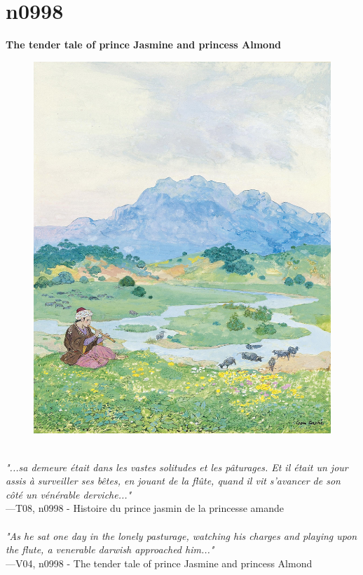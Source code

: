 \documentclass[../Carre_nights.tex]{subfiles}
\begin{document}
\newpage

\section{n0998}
\textbf{\Large{The tender tale of prince Jasmine and princess Almond}} \\

\begin{figure}[ht]
\centering
\includegraphics[height=\figsize]{illustrations/volume_8/T08, n0998 - Histoire du prince jasmin de la princesse amande.jpg}
\end{figure}

\textit{\\
"...sa demeure était dans les vastes solitudes et les pâturages. Et il était un jour assis à surveiller ses bêtes, en jouant de la flûte, quand il vit s’avancer de son côté un vénérable derviche..."} \\
—T08, n0998 - Histoire du prince jasmin de la princesse amande \\~\\
\textit{"As he sat one day in the lonely pasturage, watching his charges and playing upon the flute, a venerable darwish approached him..."} \\
—V04, n0998 - The tender tale of prince Jasmine and princess Almond
\end{document}
